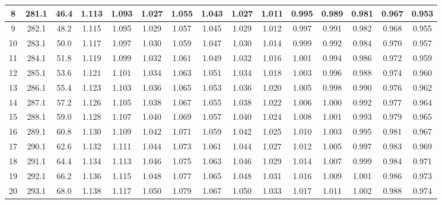 \documentclass[12pt,a4paper,twoside]{article}
\begin{document}
\begin{center}
\begin{longtable}{ c c c | c c c c c c c c c c c c}
 8 & 281.1 & 46.4 & 1.113 & 1.093 & 1.027 & 1.055 & 1.043 & 1.027 & 1.011 & 0.995 & 0.989 & 0.981 & 0.967 & 0.953 \\ \hline   
 
 9 & 282.1 & 48.2 & 1.115 & 1.095 & 1.029 & 1.057 & 1.045 & 1.029 & 1.012 & 0.997 & 0.991 & 0.982 & 0.968 & 0.955 \\ \hline   
 
 10 & 283.1 & 50.0 & 1.117 & 1.097 & 1.030 & 1.059 & 1.047 & 1.030 & 1.014 & 0.999 & 0.992 & 0.984 & 0.970 & 0.957 \\ \hline   
 
 11 & 284.1 & 51.8 & 1.119 & 1.099 & 1.032 & 1.061 & 1.049 & 1.032 & 1.016 & 1.001 & 0.994 & 0.986 & 0.972 & 0.959 \\ \hline   
 
 12 & 285.1 & 53.6 & 1.121 & 1.101 & 1.034 & 1.063 & 1.051 & 1.034 & 1.018 & 1.003 & 0.996 & 0.988 & 0.974 & 0.960 \\ \hline   
 
 13 & 286.1 & 55.4 & 1.123 & 1.103 & 1.036 & 1.065 & 1.053 & 1.036 & 1.020 & 1.005 & 0.998 & 0.990 & 0.976 & 0.962 \\ \hline   
 
 14 & 287.1 & 57.2 & 1.126 & 1.105 & 1.038 & 1.067 & 1.055 & 1.038 & 1.022 & 1.006 & 1.000 & 0.992 & 0.977 & 0.964 \\ \hline   
 
 15 & 288.1 & 59.0 & 1.128 & 1.107 & 1.040 & 1.069 & 1.057 & 1.040 & 1.024 & 1.008 & 1.001 & 0.993 & 0.979 & 0.965 \\ \hline   
 
 16 & 289.1 & 60.8 & 1.130 & 1.109 & 1.042 & 1.071 & 1.059 & 1.042 & 1.025 & 1.010 & 1.003 & 0.995 & 0.981 & 0.967 \\ \hline   
 
 17 & 290.1 & 62.6 & 1.132 & 1.111 & 1.044 & 1.073 & 1.061 & 1.044 & 1.027 & 1.012 & 1.005 & 0.997 & 0.983 & 0.969 \\ \hline   
 
 18 & 291.1 & 64.4 & 1.134 & 1.113 & 1.046 & 1.075 & 1.063 & 1.046 & 1.029 & 1.014 & 1.007 & 0.999 & 0.984 & 0.971 \\ \hline   
 
 19 & 292.1 & 66.2 & 1.136 & 1.115 & 1.048 & 1.077 & 1.065 & 1.048 & 1.031 & 1.016 & 1.009 & 1.001 & 0.986 & 0.973 \\ \hline   
 
 20 & 293.1 & 68.0 & 1.138 & 1.117 & 1.050 & 1.079 & 1.067 & 1.050 & 1.033 & 1.017 & 1.011 & 1.002 & 0.988 & 0.974 \\ \hline   
 

\end{longtable}
\end{center}
\end{document}
